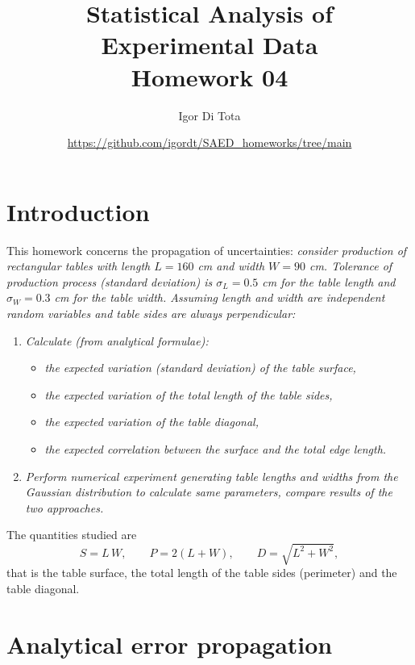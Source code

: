 \documentclass[11pt,a4paper]{article}
\title{Statistical Analysis of Experimental Data\\
	\vspace{0.2cm}
	\large{Homework 04}}
\author{Igor Di Tota}
\date{\small \url{https://github.com/igordt/SAED_homeworks/tree/main}}
\begin{document}
	\maketitle
	
	\section*{Introduction}
	
	This homework concerns the propagation of uncertainties: \textit{consider production of rectangular tables with length $L = 160$ cm and width $W = 90$ cm. Tolerance of production process (standard deviation) is $\sigma_L = 0.5$ cm for the table length and $\sigma_W = 0.3$ cm for the table width. Assuming length and width are independent random variables and table sides are always perpendicular:}
	\begin{enumerate}
		\item \textit{Calculate (from analytical formulae):}
		\begin{itemize}
			\item \textit{the expected variation (standard deviation) of the table surface,}
			\item \textit{the expected variation of the total length of the table sides,}
			\item \textit{the expected variation of the table diagonal,}
			\item \textit{the expected correlation between the surface and the total edge length.}
		\end{itemize}
		\item \textit{Perform numerical experiment generating table lengths and widths from the Gaussian distribution to calculate same parameters, compare results of the two approaches.}
	\end{enumerate}
	
	The quantities studied are
	\begin{equation}
		S = L\, W, \qquad P = 2(L + W), \qquad D = \sqrt{L^2 + W^2},
	\end{equation}
	that is the table surface, the total length of the table sides (perimeter) and the table diagonal.
	
	\section*{Analytical error propagation}
	
\end{document}
